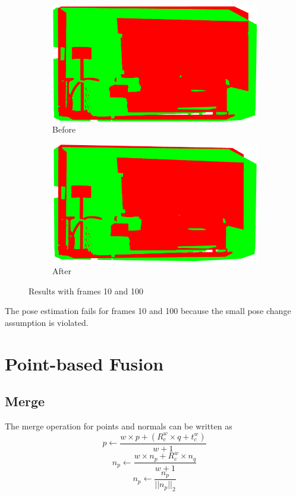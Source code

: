 \documentclass[12pt, a4paper]{article}
\begin{document}
\begin{figure}[H]
  \centering
  \begin{subfigure}[b]{0.45\textwidth}
    \includegraphics[width=\textwidth]{./results/icp/point_clouds_10_100_before.png}
    \caption{Before}
  \end{subfigure}
  \hfill
  \begin{subfigure}[b]{0.45\textwidth}
    \includegraphics[width=\textwidth]{./results/icp/point_clouds_10_100_after.png}
    \caption{After}
  \end{subfigure}
  \caption{Results with frames 10 and 100}
\end{figure}
The pose estimation fails for frames 10 and 100 because the small pose change assumption is violated.
\section{Point-based Fusion}
\subsection{Merge}
The merge operation for points and normals can be written as
\[p \leftarrow \frac{w\times p + \left(R_c^w\times q + t_c^w\right)}{w+1}\]
\[n_p \leftarrow \frac{w\times n_p + R_c^w\times n_q}{w+1}\]
\[n_p \leftarrow \frac{n_p}{||n_p||_2}\]
\end{document}
